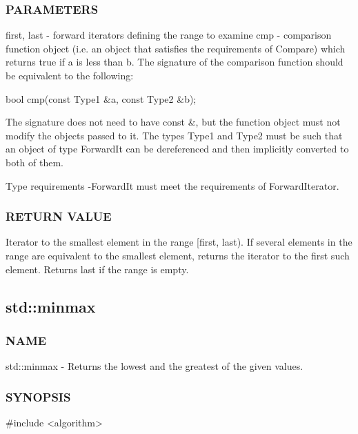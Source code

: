 \subsubsection{PARAMETERS}
first, last - forward iterators defining the range to examine
cmp - comparison function object (i.e. an object that satisfies the requirements of Compare) which returns true if  a is less than b.
The signature of the comparison function should be equivalent to the following:

 bool cmp(const Type1 \&a, const Type2 \&b);

The signature does not need to have const \&, but the function object must not modify the objects passed to it.
The types Type1 and Type2 must be such that an object of type ForwardIt can be dereferenced and then implicitly converted to both of them.

 Type requirements
 -ForwardIt must meet the requirements of ForwardIterator.

\subsubsection{RETURN VALUE}
Iterator to the smallest element in the range [first, last). If several elements in the range are equivalent to the smallest element, returns the iterator to the first such element. Returns last if the range is empty.



\subsection{std::minmax}

\subsubsection{NAME}
std::minmax - Returns the lowest and the greatest of the given values.

\subsubsection{SYNOPSIS}
\#include <algorithm>

